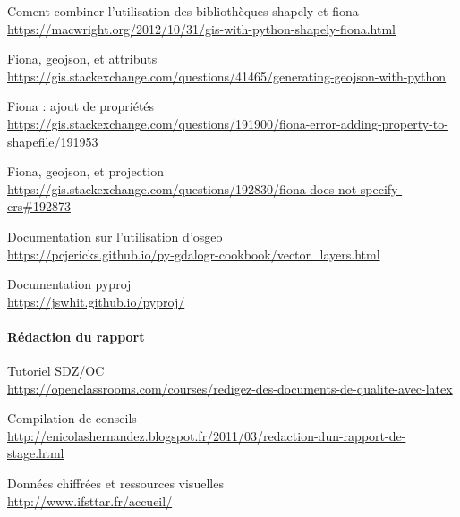 {\begin{description}
    \item Coment combiner l'utilisation des bibliothèques shapely et fiona \\
    \url{https://macwright.org/2012/10/31/gis-with-python-shapely-fiona.html}

    \item Fiona, geojson, et attributs \\
    \url{https://gis.stackexchange.com/questions/41465/generating-geojson-with-python}

    \item Fiona : ajout de propriétés \\
    \url{https://gis.stackexchange.com/questions/191900/fiona-error-adding-property-to-shapefile/191953}

    \item Fiona, geojson, et projection \\
    \url{https://gis.stackexchange.com/questions/192830/fiona-does-not-specify-crs#192873}

    \item Documentation sur l'utilisation d'osgeo \\
    \url{https://pcjericks.github.io/py-gdalogr-cookbook/vector_layers.html}

    \item Documentation pyproj \\
    \url{https://jswhit.github.io/pyproj/}

\end{description}





\paragraph{Rédaction du rapport}
\begin{description}

  \item Tutoriel SDZ/OC \\
  \url{https://openclassrooms.com/courses/redigez-des-documents-de-qualite-avec-latex}

  \item Compilation de conseils \\
  \url{http://enicolashernandez.blogspot.fr/2011/03/redaction-dun-rapport-de-stage.html}

  \item Données chiffrées et ressources visuelles \\
  \url{http://www.ifsttar.fr/accueil/}

\end{description}

}

\clearpage
